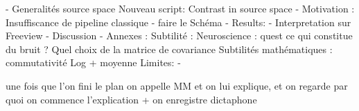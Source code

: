 - Generalités source space
Nouveau script: Contrast in source space
    - Motivation : Insuffiscance de pipeline classique
    - faire le Schéma
- Results:
    - Interpretation sur Freeview
- Discussion
- Annexes : Subtilité : 
    Neuroscience : quest ce qui constitue du bruit ? Quel choix de la matrice de covariance
    Subtilités mathématiques :  commutativité Log + moyenne
Limites:
    - 





une fois que l'on fini le plan on appelle MM et on lui explique, et on regarde par quoi on commence l'explication +  on enregistre dictaphone